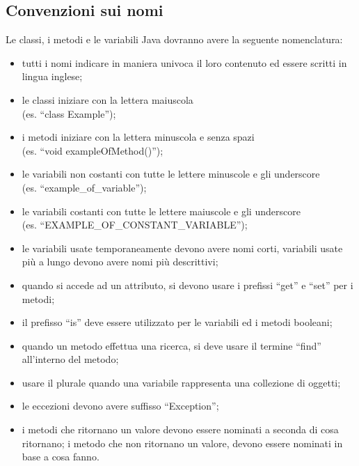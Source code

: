 \subsection{Convenzioni sui nomi}
Le classi, i metodi e le variabili Java dovranno avere la seguente nomenclatura:
\begin{itemize}
  \item {tutti i nomi indicare in maniera univoca il loro contenuto ed essere
  scritti in lingua inglese;}
  \item {le classi iniziare con la lettera maiuscola\\ 
  (es. ``class Example'');}
  \item {i metodi iniziare con la lettera minuscola e senza spazi\\ 
  (es. ``void exampleOfMethod()'');}
  \item {le variabili non costanti con tutte le lettere minuscole e gli
  underscore \\
  (es. ``example\_of\_variable'');}
  \item {le variabili costanti con tutte le lettere maiuscole e gli underscore\\
  (es. ``EXAMPLE\_OF\_CONSTANT\_VARIABLE'');}
  \item {le variabili usate temporaneamente devono avere nomi corti, variabili
  usate pi\`u a lungo devono avere nomi pi\`u descrittivi;}
  \item {quando si accede ad un attributo, si devono usare i prefissi ``get'' e
  ``set'' per i metodi;}
  \item {il prefisso ``is'' deve essere utilizzato per le variabili ed i metodi
  booleani;}
  \item {quando un metodo effettua una ricerca, si deve usare il termine
  ``find'' all'interno del metodo;}
  \item {usare il plurale quando una variabile rappresenta una collezione di
  oggetti;}
  \item {le eccezioni devono avere suffisso ``Exception'';}
  \item {i metodi che ritornano un valore devono essere nominati a seconda di
  cosa ritornano; i metodo che non ritornano un valore, devono essere nominati
  in base a cosa fanno.}
\end{itemize} 

